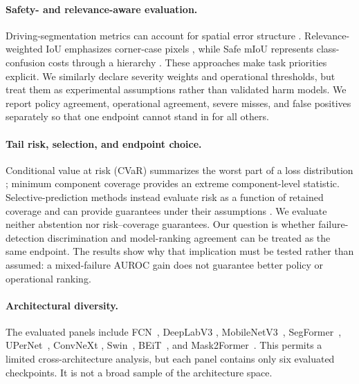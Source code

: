 \paragraph{Safety- and relevance-aware evaluation.}
Driving-segmentation metrics can account for spatial error structure
\cite{cheng2021safety}. Relevance-weighted IoU emphasizes corner-case pixels
\cite{breitenstein2023really}, while Safe mIoU represents class-confusion costs
through a hierarchy \cite{shaik2024iddaw}. These approaches make task
priorities explicit. We similarly declare severity weights and operational
thresholds, but treat them as experimental assumptions rather than validated
harm models. We report policy agreement, operational agreement, severe misses,
and false positives separately so that one endpoint cannot stand in for all
others.

\paragraph{Tail risk, selection, and endpoint choice.}
Conditional value at risk (CVaR) summarizes the worst part of a loss
distribution \cite{rockafellar2000optimization}; minimum component coverage
provides an extreme component-level statistic. Selective-prediction methods
instead evaluate risk as a function of retained coverage and can provide
guarantees under their assumptions \cite{geifman2017selective}. We evaluate
neither abstention nor risk--coverage guarantees. Our question is whether
failure-detection discrimination and model-ranking agreement can be treated as
the same endpoint. The results show why that implication must be tested rather
than assumed: a mixed-failure AUROC gain does not guarantee better policy or
operational ranking.

\paragraph{Architectural diversity.}
The evaluated panels include FCN~\cite{long2015fully}, DeepLabV3
\cite{chen2017rethinking}, MobileNetV3~\cite{howard2019searching},
SegFormer~\cite{xie2021segformer}, UPerNet~\cite{xiao2018unified}, ConvNeXt
\cite{liu2022convnext}, Swin~\cite{liu2021swin}, BEiT~\cite{bao2022beit}, and
Mask2Former~\cite{cheng2022mask2former}. This permits a limited
cross-architecture analysis, but each panel contains only six evaluated
checkpoints. It is not a broad sample of the architecture space.
